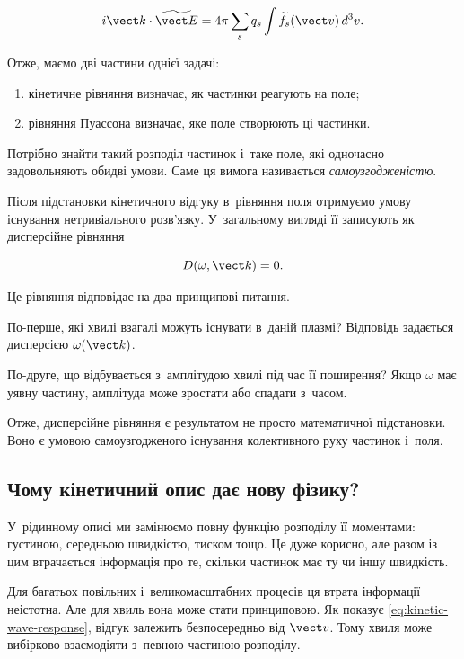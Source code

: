 \begin{equation}\label{eq:kinetic-wave-poisson-harmonic}
i\vect k\cdot\widetilde{\vect E}
=
4\pi
\sum_s q_s
\int\widetilde f_s(\vect v)\,d^3v.
\end{equation}

Отже, маємо дві частини однієї задачі:

\begin{enumerate}
\item кінетичне рівняння визначає, як частинки реагують на поле;
\item рівняння Пуассона визначає, яке поле створюють ці частинки.
\end{enumerate}

Потрібно знайти такий розподіл частинок і~таке поле, які одночасно задовольняють обидві
умови. Саме ця вимога називається \emph{самоузгодженістю}.

Після підстановки кінетичного відгуку в~рівняння поля отримуємо умову існування
нетривіального розв'язку. У~загальному вигляді її записують як дисперсійне рівняння

\begin{equation}\label{eq:kinetic-wave-dispersion-general}
D(\omega,\vect k)=0.
\end{equation}

Це рівняння відповідає на два принципові питання.

По-перше, які хвилі взагалі можуть існувати в~даній плазмі? Відповідь задається
дисперсією $\omega(\vect k)$.

По-друге, що відбувається з~амплітудою хвилі під час її поширення? Якщо $\omega$ має
уявну частину, амплітуда може зростати або спадати з~часом.

Отже, дисперсійне рівняння є результатом не просто математичної підстановки. Воно є
умовою самоузгодженого існування колективного руху частинок і~поля.

\subsection*{Чому кінетичний опис дає нову фізику?}

У~рідинному описі ми замінюємо повну функцію розподілу її моментами:
густиною, середньою швидкістю, тиском тощо. Це дуже корисно, але разом із цим
втрачається інформація про те, скільки частинок має ту чи іншу швидкість.

Для багатьох повільних і~великомасштабних процесів ця втрата інформації неістотна.
Але для хвиль вона може стати принциповою. Як показує \eqref{eq:kinetic-wave-response},
відгук залежить безпосередньо від $\vect v$. Тому хвиля може вибірково взаємодіяти
з~певною частиною розподілу.

